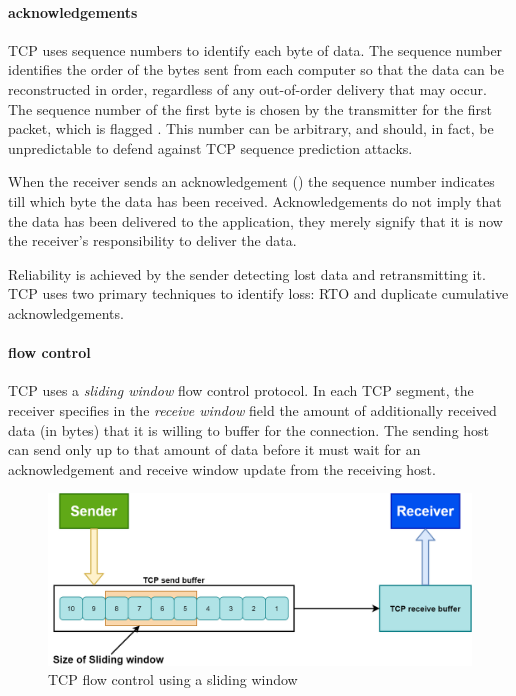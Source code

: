 \paragraph{acknowledgements}
\ac{TCP} uses sequence numbers to identify each byte of data.
The sequence number identifies the order of the bytes sent from each computer so that the data can be reconstructed in order, regardless of any out-of-order delivery that may occur.
The sequence number of the first byte is chosen by the transmitter for the first packet, which is flagged .
This number can be arbitrary, and should, in fact, be unpredictable to defend against \ac{TCP} sequence prediction attacks.

When the receiver sends an acknowledgement () the sequence number indicates till which byte the data has been received.
Acknowledgements do not imply that the data has been delivered to the application, they merely signify that it is now the receiver's responsibility to deliver the data.

Reliability is achieved by the sender detecting lost data and retransmitting it.
\ac{TCP} uses two primary techniques to identify loss: \acf{RTO} and duplicate cumulative acknowledgements.%



\paragraph{flow control}
\acs{TCP} uses a \emph{sliding window} flow control protocol.
In each \acs{TCP} segment, the receiver specifies in the \emph{receive window} field the amount of additionally received data (in bytes) that it is willing to buffer for the connection.
The sending host can send only up to that amount of data before it must wait for an acknowledgement and receive window update from the receiving host.


\begin{figure}
\centering
\includegraphics[width=.7\textwidth]{images/transport/flow-control.png}
\caption{\acs{TCP} flow control using a sliding window}
\label{fig:flow-control}
\end{figure}


